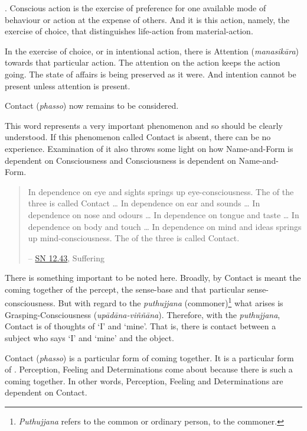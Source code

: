 . Conscious action is the exercise of preference for one available mode of behaviour or action at the expense of others. And it is this action, namely, the exercise of choice, that distinguishes life-action from material-action.

In the exercise of choice, or in intentional action, there is Attention (\emph{manasikāra}) towards that particular action. The attention on the action keeps the action going. The state of affairs is being preserved as it were. And intention cannot be present unless attention is present.

Contact (\emph{phasso}) now remains to be considered.

This word represents a very important phenomenon and so should be clearly understood. If this phenomenon called Contact is absent, there can be no experience. Examination of it also throws some light on how Name-and-Form is dependent on Consciousness and Consciousness is dependent on Name-and- Form.

\begin{quote}
In dependence on eye and sights springs up eye-consciousness. The  of the three is called Contact \ldots{} In dependence on ear and sounds \ldots{} In dependence on nose and odours \ldots{} In dependence on tongue and taste \ldots{} In dependence on body and touch \ldots{} In dependence on mind and ideas springs up mind-consciousness. The  of the three is called Contact.

 -- \href{https://suttacentral.net/sn12.43/en/bodhi}{SN 12.43}, Suffering
\end{quote}

There is something important to be noted here. Broadly, by Contact is meant the coming together of the percept, the sense-base and that particular sense-consciousness. But with regard to the \emph{puthujjana} (commoner)\footnote{\emph{Puthujjana} refers to the common or ordinary person, to the commoner.} what arises is Grasping-Consciousness (\emph{upādāna-viññāna}). Therefore, with the \emph{puthujjana}, Contact is  of thoughts of `I' and `mine'. That is, there is contact between a subject who says `I' and `mine' and the object.

Contact (\emph{phasso}) is a particular form of coming together. It is a particular form of . Perception, Feeling and Determinations come about because there is such a coming together. In other words, Perception, Feeling and Determinations are dependent on Contact.

